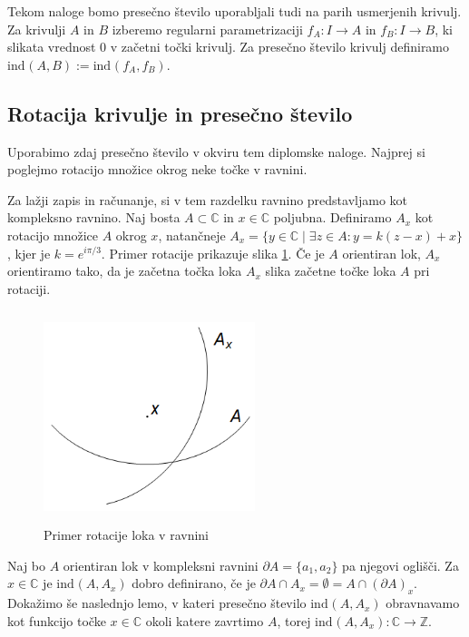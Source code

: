 \documentclass[mat1]{fmfdelo}
\newcommand{\Z}{\mathbb Z}
\newcommand{\C}{\mathbb C}
\newcommand{\ind}[3][]{\text{ind}_{#1}(#2, #3)}
\begin{document}
Tekom naloge bomo presečno število uporabljali tudi na parih usmerjenih krivulj. Za krivulji $A$ in $B$ izberemo regularni parametrizaciji $f_A \colon I \to A$ in $f_B \colon I \to B$, ki slikata vrednost $0$ v začetni točki krivulj. Za presečno število krivulj definiramo $\ind{A}{B} := \ind{f_A}{f_B}$.

\subsection{Rotacija krivulje in presečno število}

Uporabimo zdaj presečno število v okviru tem diplomske naloge. Najprej si poglejmo rotacijo množice okrog neke točke v ravnini.

Za lažji zapis in računanje, si v tem razdelku ravnino predstavljamo kot kompleksno ravnino. Naj bosta $A \subset \C$ in $x \in \C$ poljubna. Definiramo $A_x$ kot rotacijo množice $A$ okrog $x$, natančneje $A_x = \{ y \in \C \mid \exists z \in A: y = k(z-x) + x\}$, kjer je $k = e^{i\pi / 3}$. Primer rotacije prikazuje slika \ref{fig:rotacija_osnovna}. Če je $A$ orientiran lok, $A_x$ orientiramo tako, da je začetna točka loka $A_x$ slika začetne točke loka $A$ pri rotaciji.

\begin{figure}[h!]
\centering
\includegraphics[width = 175pt, height = 175pt]{rotacija_zacetna.png}
\caption{Primer rotacije loka v ravnini}
\label{fig:rotacija_osnovna}
\end{figure}

Naj bo $A$ orientiran lok v kompleksni ravnini $\partial A = \{a_1, a_2\}$ pa njegovi oglišči. Za $x\in \C$ je $\ind{A}{A_x}$ dobro definirano, če je $\partial A \cap A_x = \emptyset = A \cap (\partial A)_x$. Dokažimo še naslednjo lemo, v kateri presečno število $\ind{A}{A_x}$ obravnavamo kot funkcijo točke $x \in \C$ okoli katere zavrtimo $A$, torej $\ind{A}{A_x} \colon \C \to \Z$.
\end{document}
